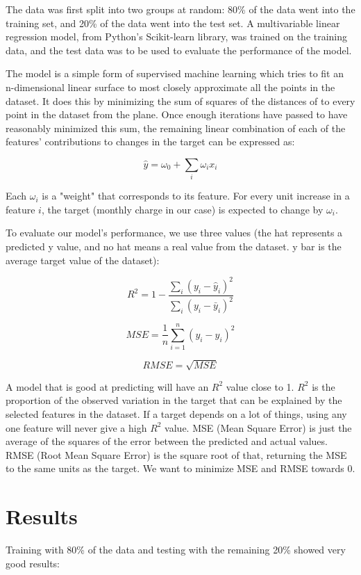 \documentclass[12pt, letterpaper]{article}
\begin{document}
The data was first split into two groups at random: 80\% of the data went into the training set, and 20\% of the data went into the test set. A multivariable linear regression model, from Python's Scikit-learn library, was trained on the training data, and the test data was to be used to evaluate the performance of the model.

The model is a simple form of supervised machine learning which tries to fit an n-dimensional linear surface to most closely approximate all the points in the dataset. It does this by minimizing the sum of squares of the distances of to every point in the dataset from the plane. Once enough iterations have passed to have reasonably minimized this sum, the remaining linear combination of each of the features' contributions to changes in the target can be expressed as:

\[ \hat y = \omega_0 +\sum_i \omega_i x_i \]

Each $\omega_i$ is a "weight" that corresponds to its feature. For every unit increase in a feature $i$, the target (monthly charge in our case) is expected to change by $\omega_i$.

To evaluate our model's performance, we use three values (the hat represents a predicted y value, and no hat means a real value from the dataset. y bar is the average target value of the dataset):

\[ R^2 = 1 - \frac{\sum_{i}(y_i - \hat y_i)^2 }{\sum_{i}(y_i - \bar y_i)^2}\]

\[ MSE = \frac{1}{n} \sum_{i=1}^n (y_i - \hat y_i)^2 \]

\[ RMSE = \sqrt{MSE}\]

A model that is good at predicting will have an $R^2$ value close to 1. $R^2$ is the proportion of the observed variation in the target that can be explained by the selected features in the dataset. If a target depends on a lot of things, using any one feature will never give a high $R^2$ value. MSE (Mean Square Error) is just the average of the squares of the error between the predicted and actual values. RMSE (Root Mean Square Error) is the square root of that, returning the MSE to the same units as the target. We want to minimize MSE and RMSE towards 0.

\section {Results}

Training with 80\% of the data and testing with the remaining 20\% showed very good results: 
\end{document}
